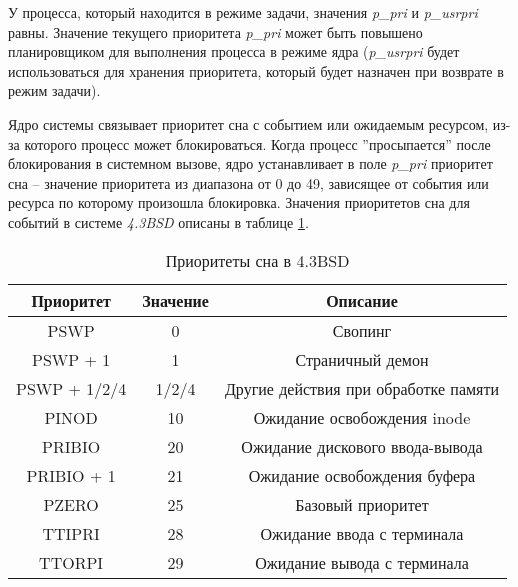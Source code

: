 У процесса, который находится в режиме задачи, значения \textit{p\_pri} и \textit{p\_usrpri} равны. Значение текущего приоритета \textit{p\_pri} может быть повышено планировщиком для выполнения процесса в режиме ядра (\textit{p\_usrpri} будет использоваться для хранения приоритета, который будет назначен при возврате в режим задачи).

Ядро системы связывает приоритет сна с событием или ожидаемым ресурсом, из-за которого процесс может блокироваться. Когда процесс ''просыпается'' после
блокирования в системном вызове, ядро устанавливает в поле \textit{p\_pri} приоритет сна – значение приоритета из диапазона от 0 до 49, зависящее от события или ресурса по которому произошла блокировка. Значения приоритетов сна для событий в системе \textit{4.3BSD} описаны в таблице \ref{tbl:bsd}.

\begin{table}[h]
    \begin{center}
        \begin{threeparttable}
        \captionsetup{justification=raggedright,singlelinecheck=off}
        \caption{Приоритеты сна в 4.3BSD}
        \label{tbl:bsd}
        \begin{tabular}{|c|c|c|}
            \hline
            Приоритет & Значение & Описание \\
            \hline
            PSWP & 0 & Свопинг \\ \hline  
            PSWP + 1 & 1 & Страничный демон \\ \hline
            PSWP + 1/2/4 & 1/2/4 & Другие действия при обработке памяти \\ \hline
            PINOD & 10 & Ожидание освобождения inode  \\ \hline 
            PRIBIO & 20 & Ожидание дискового ввода-вывода \\ \hline
            PRIBIO + 1 & 21 & Ожидание освобождения буфера \\ \hline
            PZERO & 25 & Базовый приоритет \\ \hline
            TTIPRI & 28 & Ожидание ввода с терминала \\ \hline
            TTORPI & 29 & Ожидание вывода с терминала \\ \hline                                             
		\end{tabular}
    \end{threeparttable}
\end{center}
\end{table}

